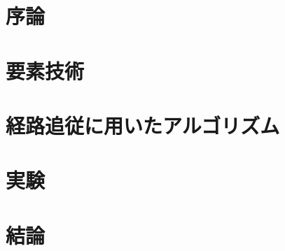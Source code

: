 \chapter{序論}
\label{chap:introduction}
%
%
%

%
\chapter{要素技術}
\chapter{経路追従に用いたアルゴリズム}
\chapter{実験}
\chapter{結論}
